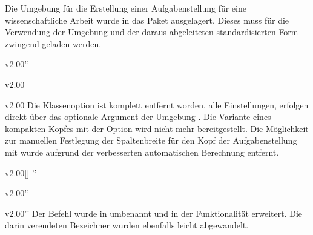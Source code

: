 \minisec{\taskname}
%
\begin{Entity}{}
Die Umgebung für die Erstellung einer Aufgabenstellung für eine 
wissenschaftliche Arbeit wurde in das Paket  
ausgelagert. Dieses muss für die Verwendung der Umgebung  
und der daraus abgeleiteten standardisierten Form zwingend geladen werden.

\begin{Obsolete}{v2.00}{}''
\begin{Obsolete}{v2.00}{}
\begin{Obsolete}{v2.00}{}
\printdeclarationlist%
%
Die Klassenoption  ist komplett entfernt worden, alle 
Einstellungen, erfolgen direkt über das optionale Argument der Umgebung 
. Die Variante eines kompakten Kopfes mit der Option 
 wird nicht mehr bereitgestellt. Die Möglichkeit zur 
manuellen Festlegung der Spaltenbreite für den Kopf der Aufgabenstellung mit 
 wurde aufgrund der verbesserten automatischen Berechnung 
entfernt.
\end{Obsolete}
\end{Obsolete}
\end{Obsolete}

\begin{Obsolete}{v2.00}{[]}%
  ''
\begin{Obsolete}{v2.00}{}''
\begin{Obsolete}{v2.00}{}''
\printdeclarationlist%
%
Der Befehl  wurde in  umbenannt und in der 
Funktionalität erweitert. Die darin verendeten Bezeichner wurden ebenfalls 
leicht abgewandelt.
\end{Obsolete}
\end{Obsolete}
\end{Obsolete}


\end{Entity}
